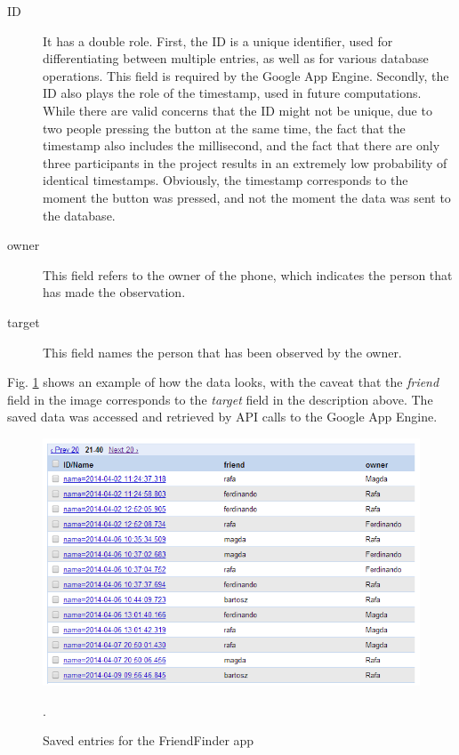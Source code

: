 \begin{description}
  \item[ID] It has a double role. First, the ID is a unique identifier, used for differentiating between multiple entries, as well as for various database operations. This field is required by the Google App Engine. Secondly, the ID also plays the role of the timestamp, used in future computations. While there are valid concerns that the ID might not be unique, due to two people pressing the button at the same time, the fact that the timestamp also includes the millisecond, and the fact that there are only three participants in the project results in an extremely low probability of identical timestamps. Obviously, the timestamp corresponds to the moment the button was pressed, and not the moment the data was sent to the database.  
  \item[owner] This field refers to the owner of the phone, which indicates the person that has made the observation.
  \item[target] This field names the person that has been observed by the owner.
\end{description}

Fig. \ref{pic:dataviewer} shows an example of how the data looks, with the caveat that the \textit{friend} field in the image corresponds to the \textit{target} field in the description above. The saved data was accessed and retrieved by API calls to the Google App Engine.  

\begin{figure}[h]
	\begin{center}
		\includegraphics[scale=0.8]{figures/datastore.png}
	\end{center}
	
	\caption{Saved entries for the FriendFinder app}.
	\label{pic:dataviewer}

\end{figure}


